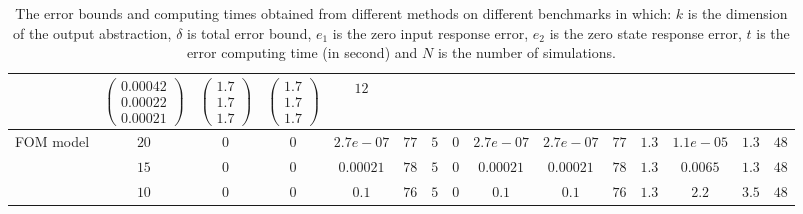 \begin{table*}[t]
\begin{tabular}{|p{1.5cm}|c|c|c|c|c|c|c|c|c|c|c|c|c|c|}
&$\begin{pmatrix}0.00042  \\ 0.00022  \\ 0.00021 \end{pmatrix}$ &$\begin{pmatrix}1.7  \\ 1.7  \\ 1.7 \end{pmatrix}$ &$\begin{pmatrix}1.7  \\ 1.7  \\ 1.7 \end{pmatrix}$ & $12$  \\ 
\hline 

\multirow{3}{*}{\parbox{1.5cm}{FOM model}} 
& $20$ 
& $0$ & $0$ 
&$2.7e-07$& $77$ &{$5$} 
&$0$ &$2.7e-07$ &$2.7e-07$ &$77$ 
&$1.3$ &$1.1e-05$ &$1.3$ &$48$ \\ 
\cline{2-15} 
& $15$ 
& $0$ & $0$ 
&$0.00021$& $78$ &{$5$} 
&$0$ &$0.00021$ &$0.00021$ &$78$ 
&$1.3$ &$0.0065$ &$1.3$ &$48$ \\ 
\cline{2-15} 
& $10$ 
& $0$ & $0$ 
&$0.1$& $76$ &{$5$} 
&$0$ &$0.1$ &$0.1$ &$76$ 
&$1.3$ &$2.2$ &$3.5$ &$48$ \\ 
\hline 

\end{tabular} 
 \caption{The error bounds and computing times obtained from different methods on different benchmarks in which: $k$ is the dimension of the output abstraction, $\delta$ is total error bound, $e_1$ is the zero input response error, $e_2$ is the zero state response error, $t$ is the error computing time (in second) and $N$ is the number of simulations.} 
\end{table*} 
